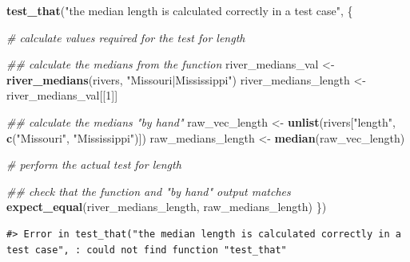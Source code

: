 \documentclass[
]{book}
\newenvironment{Shaded}{\begin{snugshade}}{\end{snugshade}}
\newcommand{\CommentTok}[1]{\textcolor[rgb]{0.56,0.35,0.01}{\textit{#1}}}
\newcommand{\DecValTok}[1]{\textcolor[rgb]{0.00,0.00,0.81}{#1}}
\newcommand{\KeywordTok}[1]{\textcolor[rgb]{0.13,0.29,0.53}{\textbf{#1}}}
\newcommand{\NormalTok}[1]{#1}
\newcommand{\StringTok}[1]{\textcolor[rgb]{0.31,0.60,0.02}{#1}}
\begin{document}
\begin{Shaded}
\begin{Highlighting}[]
\KeywordTok{test_that}\NormalTok{(}\StringTok{"the median length is calculated correctly in a test case"}\NormalTok{, \{}
  
  \CommentTok{# calculate values required for the test for length}

  \CommentTok{## calculate the medians from the function}
\NormalTok{  river_medians_val <-}\StringTok{ }\KeywordTok{river_medians}\NormalTok{(rivers, }\StringTok{"Missouri|Mississippi"}\NormalTok{)}
\NormalTok{  river_medians_length <-}\StringTok{ }\NormalTok{river_medians_val[[}\DecValTok{1}\NormalTok{]]}

  \CommentTok{## calculate the medians "by hand"}
\NormalTok{  raw_vec_length <-}\StringTok{ }\KeywordTok{unlist}\NormalTok{(rivers[}\StringTok{"length"}\NormalTok{, }\KeywordTok{c}\NormalTok{(}\StringTok{"Missouri"}\NormalTok{, }\StringTok{"Mississippi"}\NormalTok{)])}
\NormalTok{  raw_medians_length <-}\StringTok{ }\KeywordTok{median}\NormalTok{(raw_vec_length)}
  
  \CommentTok{# perform the actual test for length}

  \CommentTok{## check that the function and "by hand" output matches}
  \KeywordTok{expect_equal}\NormalTok{(river_medians_length, raw_medians_length)}
\NormalTok{\})}
\end{Highlighting}
\end{Shaded}

\begin{verbatim}
#> Error in test_that("the median length is calculated correctly in a test case", : could not find function "test_that"
\end{verbatim}
\end{document}
